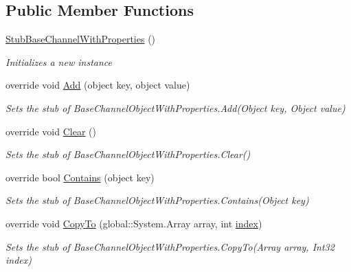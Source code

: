 \subsection*{Public Member Functions}
\begin{DoxyCompactItemize}
\item 
\hyperlink{class_system_1_1_runtime_1_1_remoting_1_1_channels_1_1_fakes_1_1_stub_base_channel_with_properties_abfdfad67c97a60b19ad9c7744b029ef4}{Stub\-Base\-Channel\-With\-Properties} ()
\begin{DoxyCompactList}\small\item\em Initializes a new instance\end{DoxyCompactList}\item 
override void \hyperlink{class_system_1_1_runtime_1_1_remoting_1_1_channels_1_1_fakes_1_1_stub_base_channel_with_properties_ab5ca08a8cc9638e6bb83b9a2e3ae750a}{Add} (object key, object value)
\begin{DoxyCompactList}\small\item\em Sets the stub of Base\-Channel\-Object\-With\-Properties.\-Add(\-Object key, Object value)\end{DoxyCompactList}\item 
override void \hyperlink{class_system_1_1_runtime_1_1_remoting_1_1_channels_1_1_fakes_1_1_stub_base_channel_with_properties_a20dbd63af996ef9930e2d697e037cc6c}{Clear} ()
\begin{DoxyCompactList}\small\item\em Sets the stub of Base\-Channel\-Object\-With\-Properties.\-Clear()\end{DoxyCompactList}\item 
override bool \hyperlink{class_system_1_1_runtime_1_1_remoting_1_1_channels_1_1_fakes_1_1_stub_base_channel_with_properties_ad669d133cdc3a5f8c85b9a4927f5b85a}{Contains} (object key)
\begin{DoxyCompactList}\small\item\em Sets the stub of Base\-Channel\-Object\-With\-Properties.\-Contains(\-Object key)\end{DoxyCompactList}\item 
override void \hyperlink{class_system_1_1_runtime_1_1_remoting_1_1_channels_1_1_fakes_1_1_stub_base_channel_with_properties_a31aec3a25ad788973257dd8c46ebd186}{Copy\-To} (global\-::\-System.\-Array array, int \hyperlink{jquery-1_810_82-vsdoc_8js_a75bb12d1f23302a9eea93a6d89d0193e}{index})
\begin{DoxyCompactList}\small\item\em Sets the stub of Base\-Channel\-Object\-With\-Properties.\-Copy\-To(\-Array array, Int32 index)\end{DoxyCompactList}\item 

\end{DoxyCompactItemize}
